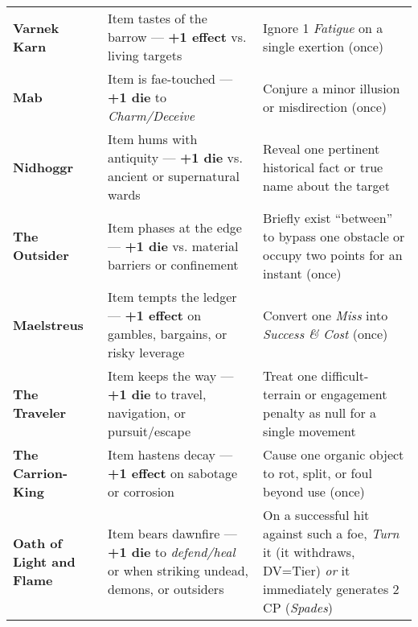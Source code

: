 \documentclass[12pt,twoside]{book}
\begin{document}
\begin{table}[htbp]
\begin{tabular}{>{\bfseries}p{3.2cm} >{\raggedright\arraybackslash}p{6.1cm} >{\raggedright\arraybackslash}p{6.1cm}}
Varnek Karn & Item tastes of the barrow — \textbf{+1 effect} vs. living targets & Ignore 1 \emph{Fatigue} on a single exertion (once) \\
Mab & Item is fae-touched — \textbf{+1 die} to \emph{Charm/Deceive} & Conjure a minor illusion or misdirection (once) \\
Nidhoggr & Item hums with antiquity — \textbf{+1 die} vs. ancient or supernatural wards & Reveal one pertinent historical fact or true name about the target \\
The Outsider & Item phases at the edge — \textbf{+1 die} vs. material barriers or confinement & Briefly exist “between” to bypass one obstacle or occupy two points for an instant (once) \\
Maelstreus & Item tempts the ledger — \textbf{+1 effect} on gambles, bargains, or risky leverage & Convert one \emph{Miss} into \emph{Success \& Cost} (once) \\
The Traveler & Item keeps the way — \textbf{+1 die} to travel, navigation, or pursuit/escape & Treat one difficult-terrain or engagement penalty as null for a single movement \\
The Carrion-King & Item hastens decay — \textbf{+1 effect} on sabotage or corrosion & Cause one organic object to rot, split, or foul beyond use (once) \\
Oath of Light and Flame & Item bears dawnfire — \textbf{+1 die} to \emph{defend/heal} or when striking undead, demons, or outsiders & On a successful hit against such a foe, \emph{Turn} it (it withdraws, DV=Tier) \emph{or} it immediately generates 2 CP (\emph{Spades}) \\
\bottomrule
\end{tabular}
\end{table}
\end{document}
